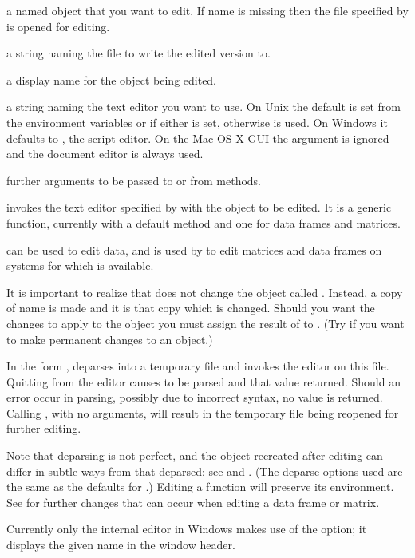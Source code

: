 \begin{Arguments}
\begin{ldescription}
\item[\code{name}] a named object that you want to edit. If name is missing
then the file specified by  is opened for editing.
\item[\code{file}] a string naming the file to write the edited version to.
\item[\code{title}] a display name for the object being edited.
\item[\code{editor}] a string naming the text editor you want to use.  On
Unix the default is set from the environment variables 
or  if either is set, otherwise  is used.  On
Windows it defaults to , the script editor.  On the
Mac OS X GUI the argument is ignored and the document editor is
always used.
\item[\code{...}] further arguments to be passed to or from methods.
\end{ldescription}
\end{Arguments}
%
\begin{Details}\relax
{} invokes the text editor specified by  with
the object  to be edited.  It is a generic function,
currently with a default method and one for data frames and matrices.

 can be used to edit data, and is used by 
to edit matrices and data frames on systems for which
 is available.

It is important to realize that  does not change the object
called . Instead, a copy of name is made and it is that
copy which is changed.  Should you want the changes to apply to the
object  you must assign the result of  to
.  (Try  if you want to make permanent
changes to an object.)

In the form ,
 deparses  into a temporary file and invokes the
editor  on this file. Quitting from the editor causes
 to be parsed and that value returned.
Should an error occur in parsing, possibly due to incorrect syntax, no
value is returned. Calling , with no arguments, will
result in the temporary file being reopened for further editing.

Note that deparsing is not perfect, and the object recreated after
editing can differ in subtle ways from that deparsed: see
 and . (The deparse options
used are the same as the defaults for .)  Editing a
function will preserve its environment.  See
 for further changes that can occur when
editing a data frame or matrix.

Currently only the internal editor in Windows makes use of the 
 option; it displays the given name in the window 
header.
\end{Details}
